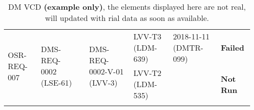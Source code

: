 \begin{longtable}[]{|p{1.5cm}|p{2.7cm}|p{1.5cm}|p{3.2cm}|p{1.5cm}|p{1.7cm}|p{1.5cm}|}
\multirow{2}{*}{
\tiny OSR-REQ-007} &
\multirow{2}{*}{
\begin{minipage}[t]{0.9\columnwidth}
{\small DMS-REQ-0002}\newline
{\scriptsize (LSE-61)}
\end{minipage}} &
\multirow{2}{*}{} &
\multirow{2}{*}{
\begin{minipage}[t]{0.9\columnwidth}
{\small DMS-REQ-0002-V-01}\newline
{\scriptsize (LVV-3)}
\end{minipage}} &
\begin{minipage}[t]{0.9\columnwidth}
{\small LVV-T3}\newline
{\scriptsize (LDM-639)}
\end{minipage} &
\begin{minipage}[t]{0.9\columnwidth}
{\small 2018-11-11}\newline
{\scriptsize (DMTR-099)}
\end{minipage} &
{\small \bf Failed} \\ \cline{5-7}
 & & & &
\begin{minipage}[t]{0.9\columnwidth}
{\small LVV-T2}\newline
{\scriptsize (LDM-535)}
\end{minipage} &
 &
{\small \bf Not Run}
\\\hline

\caption{DM VCD {\bf (example only)}, the elements displayed here are not real, will updated with rial data as soon as available.}
\label{tab:dmvcd}
\end{longtable}
